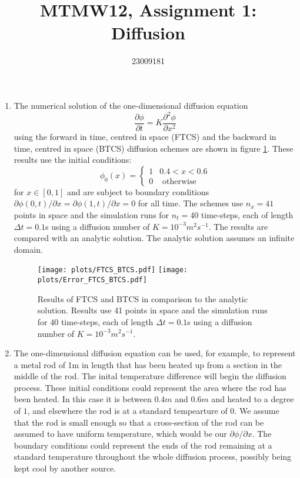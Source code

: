 \documentclass[12pt]{article}
\begin{document}
\thispagestyle{empty}

\title{MTMW12, Assignment 1: Diffusion}
\author{23009181}
\maketitle


\begin{enumerate}

\item The numerical solution of the one-dimensional diffusion equation
\begin{equation}
\frac{\partial\phi}{\partial t}=K\frac{\partial^{2}\phi}{\partial x^{2}}
\end{equation}
using the forward in time, centred in space (FTCS) and the backward
in time, centred in space (BTCS) diffusion schemes are shown in figure
\ref{fig:Q1}. These results use the initial conditions: 
\[
\phi_{0}(x)=\begin{cases}
1 & 0.4<x<0.6\\
0 & \text{ otherwise}
\end{cases}
\]
for $x\in[0,1]$ and are subject to boundary conditions $\partial\phi(0,t)/\partial x=\partial\phi(1,t)/\partial x=0$
for all time. The schemes use $n_{x}=41$ points in space and the
simulation runs for $n_{t}=40$ time-steps, each of length $\Delta t=0.1$s
using a diffusion number of $K=10^{-3}m^{2}s^{-1}$. The results are
compared with an analytic solution. The analytic solution assumes
an infinite domain.


\begin{figure}[!tbh]
\texttt{[image: plots/FTCS\_BTCS.pdf]}
\texttt{[image: plots/Error\_FTCS\_BTCS.pdf]}

\caption{Results of FTCS and BTCS in comparison to the analytic solution. Results
use 41 points in space and the simulation runs for 40 time-steps,
each of length $\Delta t=0.1$s using a diffusion number of $K=10^{-3}m^{2}s^{-1}$.
\label{fig:Q1}}
\end{figure}


\item The one-dimensional diffusion equation can be used, for example, to
represent a metal rod of 1m in length that has been heated up from a section in the middle of the rod. The inital temperature difference will begin the diffusion process.
These initial conditions could represent the area where the rod has been heated. In this case it is between $0.4m$ and $0.6m$ and heated to a degree of $1$, and elsewhere the rod is at a standard tempearture of $0$. We assume that the rod is small enough so that a cross-section of the rod can be assumed to have uniform temperature, which would be our $\partial\phi/\partial x$.
The boundary conditions could represent the ends of the rod remaining at a standard temperature throughout the whole diffusion process, possibly being kept cool by another source.



\end{enumerate}
\end{document}
